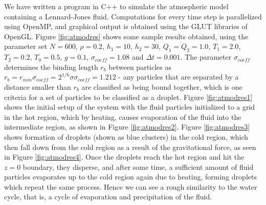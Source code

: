 \documentclass[a4paper,10pt]{article}
\begin{document}
We have written a program in C++ to simulate the atmospheric model containing a Lennard-Jones fluid. Computations for every time step is parallelized using OpenMP, and graphical output is obtained using the GLUT libraries of OpenGL. Figure \ref{fig:atmodres} shows some sample results obtained, using the parameter set $N = 600$, $\rho = 0.2$, $h_1 = 10$, $h_2 = 30$, $Q_1=Q_2=1.0$, $T_1=2.0$, $T_2=0.2$, $T_0 = 0.5$, $g=0.1$, $\sigma_{coeff}=1.08$ and $\Delta t=0.001$. The parameter $\sigma_{coeff}$ determines the binding length $r_b$ between particles as $r_b = r_{min} \sigma_{coeff} = 2^{1/6} \sigma \sigma_{coeff} = 1.212$ - any particles that are separated by a distance smaller than $r_b$ are classified as being bound together, which is one criteria for a set of particles to be classified as a droplet. Figure \ref{fig:atmodres1} shows the initial setup of the system with the fluid particles initialized to a grid in the hot region, which by heating, causes evaporation of the fluid into the intermediate region, as shown in Figure \ref{fig:atmodres2}. Figure \ref{fig:atmodres3} shows formation of droplets (shown as blue clusters) in the cold region, which then fall down from the cold region as a result of the gravitational force, as seen in Figure \ref{fig:atmodres4}. Once the droplets reach the hot region and hit the $z=0$ boundary, they disperse, and after some time, a sufficient amount of fluid particles evaporates up to the cold region again due to heating, forming droplets which repeat the same process. Hence we can see a rough similarity to the water cycle, that is, a cycle of evaporation and precipitation of the fluid.
\end{document}

